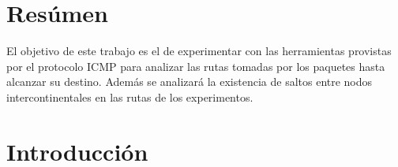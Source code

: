 \section{Resúmen}

El objetivo de este trabajo es el de experimentar con las herramientas provistas por el protocolo ICMP para analizar las rutas tomadas por los paquetes hasta alcanzar su destino. Además se analizará la existencia de saltos entre nodos intercontinentales en las rutas de los experimentos.

\section{Introducción}
